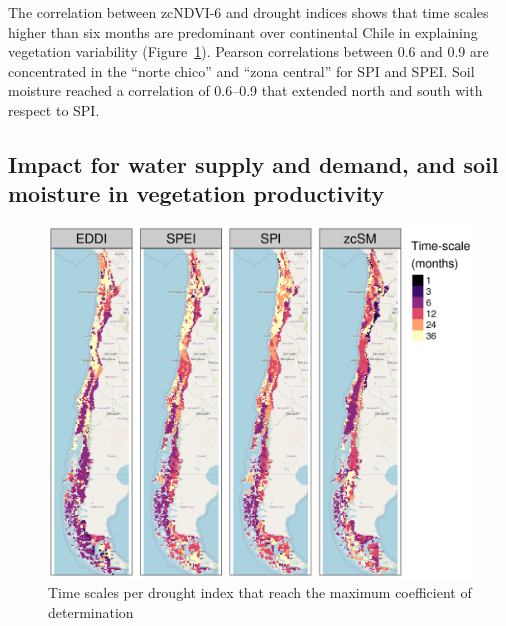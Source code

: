 \documentclass[
  number,
  preprint,
  3p,
  onecolumn]{elsarticle}
\begin{document}
The correlation between zcNDVI-6 and drought indices shows that time
scales higher than six months are predominant over continental Chile in
explaining vegetation variability (Figure~\ref{fig-corTimeScale}).
Pearson correlations between 0.6 and 0.9 are concentrated in the ``norte
chico'' and ``zona central'' for SPI and SPEI. Soil moisture reached a
correlation of 0.6--0.9 that extended north and south with respect to
SPI.

\hypertarget{impact-for-water-supply-and-demand-and-soil-moisture-in-vegetation-productivity}{%
\subsection{Impact for water supply and demand, and soil moisture in
vegetation
productivity}\label{impact-for-water-supply-and-demand-and-soil-moisture-in-vegetation-productivity}}

\begin{figure}[!ht]

{\centering \includegraphics{../output/figs/mapa_cor_selec_indices_zcNDVI6.png}

}

\caption{\label{fig-corTimeScale}Time scales per drought index that
reach the maximum coefficient of determination}

\end{figure}
\end{document}

